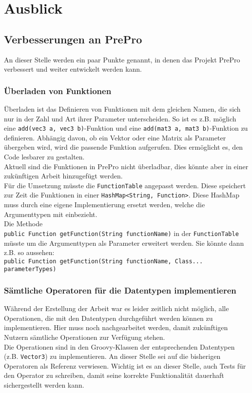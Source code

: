 
\chapter{Ausblick}
\section{Verbesserungen an PrePro}
An dieser Stelle werden ein paar Punkte genannt, in denen das Projekt PrePro verbessert und weiter entwickelt werden kann.

\subsection{Überladen von Funktionen}
Überladen ist das Definieren von Funktionen mit dem gleichen Namen, die sich nur in der Zahl und Art ihrer Parameter unterscheiden.
So ist es z.B. möglich eine \texttt{add(vec3 a, vec3 b)}-Funktion und eine \texttt{add(mat3 a, mat3 b)}-Funktion zu definieren.
Abhängig davon, ob ein Vektor oder eine Matrix als Parameter übergeben wird, wird die passende Funktion aufgerufen.
Dies ermöglicht es, den Code lesbarer zu gestalten.\\
Aktuell sind die Funktionen in PrePro nicht überladbar, dies könnte aber in einer zukünftigen Arbeit hinzugefügt werden.\\
Für die Umsetzung müsste die \texttt{FunctionTable} angepasst werden.
Diese speichert zur Zeit die Funktionen in einer \texttt{HashMap<String, Function>}.
Diese HashMap muss durch eine eigene Implementierung ersetzt werden, welche die Argumenttypen mit einbezieht.\\
Die Methode\\
\texttt{public Function getFunction(String functionName)} in der \texttt{FunctionTable} müsste um die Argumenttypen als Parameter erweitert werden.
Sie könnte dann z.B. so aussehen:\\
\texttt{public Function getFunction(String functionName, Class... parameterTypes)}

\subsection{Sämtliche Operatoren für die Datentypen implementieren}
Während der Erstellung der Arbeit war es leider zeitlich nicht möglich, alle Operationen, die mit den Datentypen durchgeführt werden können zu implementieren.
Hier muss noch nachgearbeitet werden, damit zukünftigen Nutzern sämtliche Operationen zur Verfügung stehen.\\
Die Operationen sind in den Groovy-Klassen der entsprechenden Datentypen (z.B. \texttt{Vector3}) zu implementieren.
An dieser Stelle sei auf die bisherigen Operatoren als Referenz verwiesen.
Wichtig ist es an dieser Stelle, auch Tests für den Operator zu schreiben, damit seine korrekte Funktionalität dauerhaft sichergestellt werden kann.

